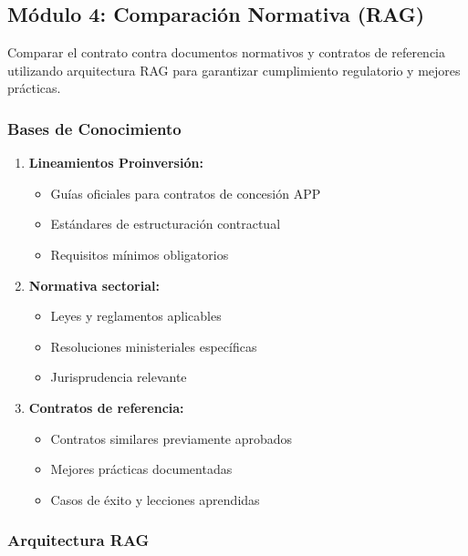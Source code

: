 \documentclass[12pt,a4paper]{article}
\begin{document}
\subsection{Módulo 4: Comparación Normativa (RAG)}

\begin{tcolorbox}[colback=darkblue!20, colframe=darkblue!80!black, title=Objetivos del Módulo 4]
Comparar el contrato contra documentos normativos y contratos de referencia utilizando arquitectura RAG para garantizar cumplimiento regulatorio y mejores prácticas.
\end{tcolorbox}

\subsubsection{Bases de Conocimiento}

\begin{enumerate}[leftmargin=*]
    \item \textbf{Lineamientos Proinversión:}
    \begin{itemize}
        \item Guías oficiales para contratos de concesión APP
        \item Estándares de estructuración contractual
        \item Requisitos mínimos obligatorios
    \end{itemize}
    
    \item \textbf{Normativa sectorial:}
    \begin{itemize}
        \item Leyes y reglamentos aplicables
        \item Resoluciones ministeriales específicas
        \item Jurisprudencia relevante
    \end{itemize}
    
    \item \textbf{Contratos de referencia:}
    \begin{itemize}
        \item Contratos similares previamente aprobados
        \item Mejores prácticas documentadas
        \item Casos de éxito y lecciones aprendidas
    \end{itemize}
\end{enumerate}

\subsubsection{Arquitectura RAG}
\end{document}
